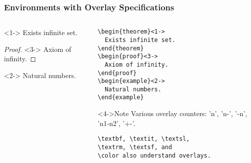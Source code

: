 \begin{frame}[fragile]
\frametitle{Environments with Overlay Specifications}%

\begin{columns}
  \begin{column}{.3\textwidth}
    \begin{theorem}<1->
      Exists infinite set.
    \end{theorem}

    \begin{proof}<3->
      Axiom of infinity.
    \end{proof}

    \begin{example}<2->
      Natural numbers.
    \end{example}
  \end{column}
  \begin{column}{.6\textwidth}
    \begin{scriptsize}
      \begin{verbatim}
\begin{theorem}<1->
  Exists infinite set.
\end{theorem}
\begin{proof}<3->
  Axiom of infinity.
\end{proof}
\begin{example}<2->
  Natural numbers.
\end{example}
      \end{verbatim}
    \end{scriptsize}
    \begin{alertblock}<4->{Note}
      \Tiny
      Various overlay counters: 'n', 'n-', '-n', 'n1-n2', '+-'.
      \begin{verbatim}
\textbf, \textit, \textsl,
\textrm, \textsf, and
\color also understand overlays.
      \end{verbatim}
    \end{alertblock}
  \end{column}
\end{columns}

\end{frame}

